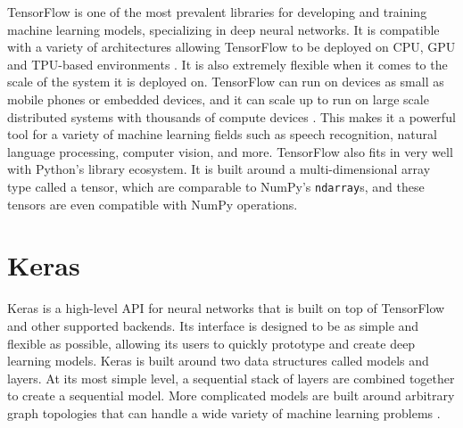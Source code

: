 TensorFlow is one of the most prevalent libraries for developing and training machine learning models, specializing in deep neural networks. It is compatible with a variety of architectures allowing TensorFlow to be deployed on CPU, GPU and TPU-based environments \cite{tensorflow}. It is also extremely flexible when it comes to the scale of the system it is deployed on. TensorFlow can run on devices as small as mobile phones or embedded devices, and it can scale up to run on large scale distributed systems with thousands of compute devices \cite{largeScaleTensorflow}. This makes it a powerful tool for a variety of machine learning fields such as speech recognition, natural language processing, computer vision, and more. TensorFlow also fits in very well with Python's library ecosystem. It is built around a multi-dimensional array type called a tensor, which are comparable to NumPy's \verb|ndarray|s, and these tensors are even compatible with NumPy operations. 


\section{Keras}

Keras is a high-level API for neural networks that is built on top of TensorFlow and other supported backends. Its interface is designed to be as simple and flexible as possible, allowing its users to quickly prototype and create deep learning models. Keras is built around two data structures called models and layers. At its most simple level, a sequential stack of layers are combined together to create a sequential model. More complicated models are built around arbitrary graph topologies that can handle a wide variety of machine learning problems \cite{keras}. 